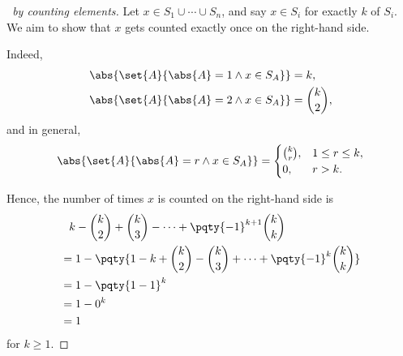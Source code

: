 \begin{proof}[\proofname\ by counting elements]
    Let \(x \in S_1 \cup \cdots \cup S_n\), and say \(x \in S_i\) for exactly \(k\) of \(S_i\). We aim to show that \(x\) gets counted exactly once on the right-hand side.

    Indeed,
    \begin{align*}
        \abs{\set{A}{\abs{A} = 1 \land x \in S_A}} &= k, \\
        \abs{\set{A}{\abs{A} = 2 \land x \in S_A}} &= \binom{k}{2},
    \end{align*}
    and in general,
    \[
        \abs{\set{A}{\abs{A} = r \land x \in S_A}} = \begin{cases}
            \binom{k}{r}, & 1 \leq r \leq k, \\ 0, & r > k.
        \end{cases}
    \]

    Hence, the number of times \(x\) is counted on the right-hand side is
    \begin{align*}
        & \phantom{=} k - \binom{k}{2} + \binom{k}{3} - \cdots + \pqty{-1}^{k + 1} \binom{k}{k} \\
        &= 1 - \pqty{1 - k + \binom{k}{2} - \binom{k}{3} + \cdots + \pqty{-1}^{k} \binom{k}{k}} \\
        &= 1 - \pqty{1 - 1}^k \\
        &= 1 - 0^k \\
        &= 1
    \end{align*}
    for \(k \geq 1\).
\end{proof}